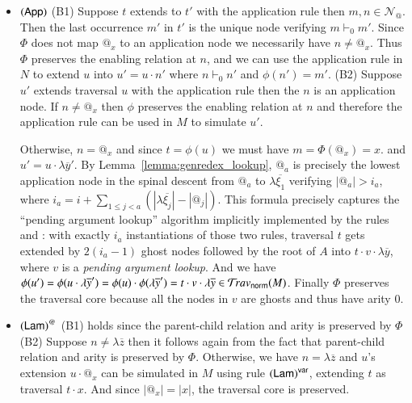 \documentclass{elsarticle}
\makeatletter
\theoremstyle{plain}
\theoremstyle{definition}
\newcommand\Nodes{\mathcal{N}}%
\newcommand\NodesApp{\Nodes_@}%
\newcommand{\normalizing}{{\sf norm}}
\newcommand{\travsetnorm}{\travset_\normalizing} %
\newcommand{\enables}{\vdash} %
\makeatother
\begin{document}
\begin{itemize}[itemindent=0.1em, leftmargin=0.4em]
    \item $\mathbf{({\sf App})}$
    (B1) Suppose $t$ extends to $t'$ with the application rule then $m, n \in\NodesApp$. Then the last occurrence $m'$ in $t'$ is the unique node verifying $m \enables_0 m'$.  Since $\Phi$ does not map $@_x$ to an application node we necessarily have  $n \neq @_x$. Thus $\Phi$ preserves the enabling relation at $n$, and we can use the application rule in $N$ to extend $u$ into $u' = u \cdot n'$ where $n \enables_0 n'$ and $\phi(n') = m'$.
    (B2) Suppose $u'$ extends traversal $u$ with the application rule then the $n$ is an application node.
    If $n\neq@_x$ then $\phi$ preserves the enabling relation at $n$ and therefore the application rule can be used in $M$ to simulate $u'$.

    Otherwise, $n=@_x$ and since $t = \phi(u)$ we must have $m = \Phi(@_x) = x$.
    and $u' = u \cdot \lambda\overline{y}'$.
%
    By Lemma~\ref{lemma:genredex_lookup}, $@_a$ is precisely the lowest application node in the spinal descent
    from $@_a$ to $\lambda\overline{\xi_1}$ verifying $|@_a| >  i_a$,
        where $i_a = i + \sum_{1\leq j< a} (|\lambda\overline{\xi_j}| - |@_j|)$.
    This formula precisely captures the ``pending argument lookup'' algorithm implicitly
    implemented by the rules  and :
    with exactly $i_a$ instantiations of those two rules, traversal $t$ gets extended by $2(i_a-1)$ ghost nodes followed
    by the root of $A$ into $t \cdot v \cdot \lambda\overline{y}$,
    where  $v$ is a \emph{pending argument lookup}.
    And we have $\phi(u')
    = \phi(u \cdot \lambda\overline{y}')
    = \phi(u) \cdot \phi(\lambda\overline{y}')
    = t \cdot v \cdot \lambda\overline{y} \in \travsetnorm(M)$.
    Finally $\Phi$ preserves the traversal core because all the nodes in $v$ are ghosts and thus have arity $0$.

    \item $\mathbf{({\sf Lam})}^@$
    (B1) holds since the parent-child relation and arity is preserved by $\Phi$
    (B2) Suppose $n \neq \lambda\overline{z}$ then it follows again from the fact that parent-child relation and arity is preserved by $\Phi$.
    Otherwise, we have $n = \lambda\overline{z}$ and $u$'s extension $u \cdot @_x$ can be simulated in $M$ using rule $\mathbf{({\sf Lam})}^{\sf var}$, extending $t$ as traversal $t \cdot x$.
    And since $|@_x| = |x|$, the traversal core is preserved.


\end{itemize}
\end{document}
